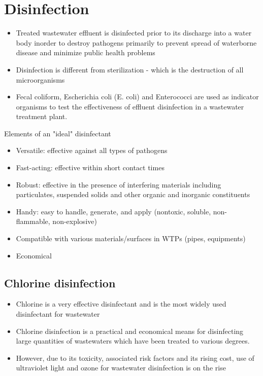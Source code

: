 
\chapter{Disinfection}

\begin{itemize}
\item Treated wastewater effluent is disinfected prior to its discharge into a water body inorder to destroy pathogens primarily to prevent spread of waterborne disease and minimize public health problems
\item Disinfection is different from sterilization - which is the destruction of all microorganisms
\item Fecal coliform, Escherichia coli (E. coli) and Enterococci are used as indicator organisms to test the effectiveness of effluent disinfection in a wastewater treatment plant.
\end{itemize}

Elements of an "ideal" disinfectant
\begin{itemize}
\item Versatile:  effective against all types of pathogens
\item Fast-acting:  effective within short contact times
\item Robust: effective in the presence of interfering materials including particulates, suspended solids and other organic and inorganic constituents
\item Handy: easy to handle, generate, and apply (nontoxic, soluble, non-flammable, non-explosive)
\item Compatible with various materials/surfaces in WTPs (pipes, equipments)
\item Economical

\end{itemize}

\section{Chlorine disinfection}

\begin{itemize}
\item Chlorine is a very effective disinfectant and is the most widely used disinfectant for wastewater 
\item Chlorine disinfection is a practical and economical means for disinfecting large quantities of wastewaters which have been treated to various degrees. 
\item However, due to its toxicity, associated risk factors and its rising cost, use of ultraviolet light and ozone for wastewater disinfection is on the rise
\end{itemize}

